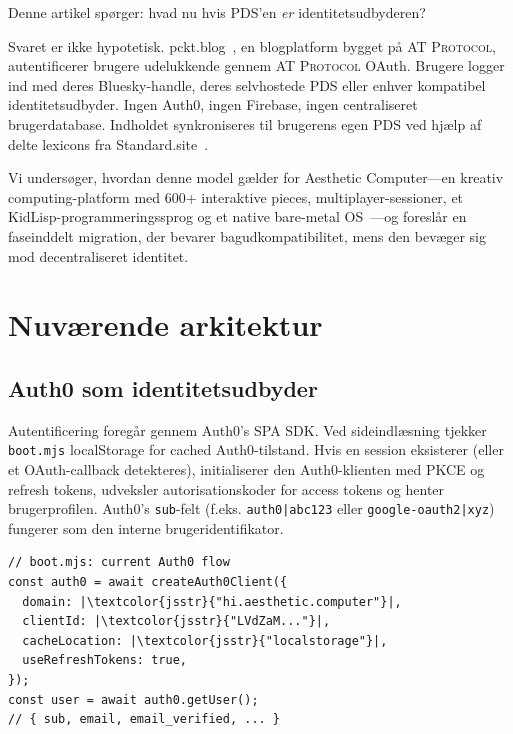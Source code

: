 \documentclass[10pt,letterpaper,twocolumn]{article}
\newcommand{\atproto}{\textsc{AT Protocol}}
\begin{document}
Denne artikel spørger: hvad nu hvis PDS'en \emph{er} identitetsudbyderen?

Svaret er ikke hypotetisk. pckt.blog~\citep{pcktblog2025}, en blogplatform bygget på \atproto{}, autentificerer brugere udelukkende gennem \atproto{} OAuth. Brugere logger ind med deres Bluesky-handle, deres selvhostede PDS eller enhver kompatibel identitetsudbyder. Ingen Auth0, ingen Firebase, ingen centraliseret brugerdatabase. Indholdet synkroniseres til brugerens egen PDS ved hjælp af delte lexicons fra Standard.site~\citep{standardsite2025}.

Vi undersøger, hvordan denne model gælder for Aesthetic Computer---en kreativ computing-platform med 600+ interaktive pieces, multiplayer-sessioner, et KidLisp-programmeringssprog og et native bare-metal OS~\citep{scudder2026os}---og foreslår en faseinddelt migration, der bevarer bagudkompatibilitet, mens den bevæger sig mod decentraliseret identitet.


\section{Nuværende arkitektur}
\label{sec:current}

\subsection{Auth0 som identitetsudbyder}

Autentificering foregår gennem Auth0's SPA SDK. Ved sideindlæsning tjekker \texttt{boot.mjs} localStorage for cached Auth0-tilstand. Hvis en session eksisterer (eller et OAuth-callback detekteres), initialiserer den Auth0-klienten med PKCE og refresh tokens, udveksler autorisationskoder for access tokens og henter brugerprofilen. Auth0's \texttt{sub}-felt (f.eks. \texttt{auth0|abc123} eller \texttt{google-oauth2|xyz}) fungerer som den interne brugeridentifikator.

\begin{lstlisting}[style=acjsstyle]
// boot.mjs: current Auth0 flow
const auth0 = await createAuth0Client({
  domain: |\textcolor{jsstr}{"hi.aesthetic.computer"}|,
  clientId: |\textcolor{jsstr}{"LVdZaM..."}|,
  cacheLocation: |\textcolor{jsstr}{"localstorage"}|,
  useRefreshTokens: true,
});
const user = await auth0.getUser();
// { sub, email, email_verified, ... }
\end{lstlisting}
\end{document}
